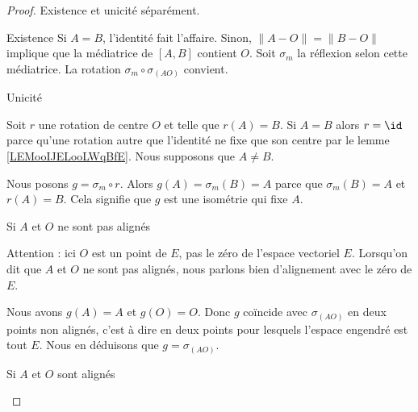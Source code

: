 \begin{proof}
    Existence et unicité séparément.
    \begin{subproof}
        \item[Existence]
            Si \( A=B\), l'identité fait l'affaire. Sinon, \( \| A-O \|=\| B-O \|\) implique que la médiatrice de \( [A,B]\) contient \( O\). Soit \( \sigma_m\) la réflexion selon cette médiatrice. La rotation \( \sigma_m\circ\sigma_{(AO)}\) convient.

        \item[Unicité]

            Soit \( r\) une rotation de centre \( O\) et telle que \( r(A)=B\). Si \( A=B\) alors \( r=\id\) parce qu'une rotation autre que l'identité ne fixe que son centre par le lemme \ref{LEMooIJELooLWqBfE}. Nous supposons que \( A\neq B\).

            Nous posons \( g=\sigma_m\circ r\). Alors \( g(A)=\sigma_m(B)=A\) parce que \( \sigma_m(B)=A\) et \( r(A)=B\). Cela signifie que \( g\) est une isométrie qui fixe \( A\). 
            
            \begin{subproof}
                \item[Si \( A\) et \( O\) ne sont pas alignés]
                
                    Attention : ici \( O\) est un point de \( E\), pas le zéro de l'espace vectoriel \( E\). Lorsqu'on dit que \( A\) et \( O\) ne sont pas alignés, nous parlons bien d'alignement avec le zéro de \( E\).

                    Nous avons \( g(A)=A\) et \( g(O)=O\). Donc \( g\) coïncide avec \( \sigma_{(AO)}\) en deux points non alignés, c'est à dire en deux points pour lesquels l'espace engendré est tout \( E\). Nous en déduisons que \( g=\sigma_{(AO)}\).

                \item[Si \( A\) et \( O\) sont alignés]
            

\end{subproof}
\end{subproof}
\end{proof}

